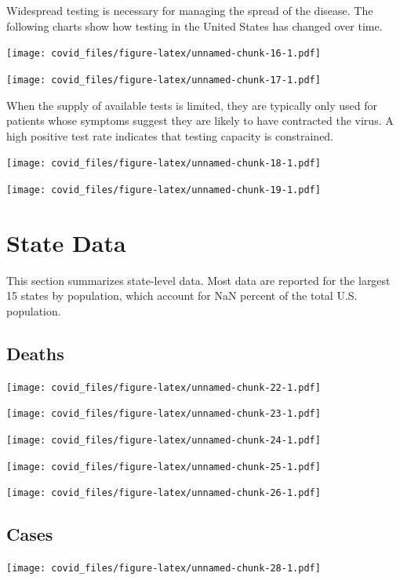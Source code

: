 \documentclass[]{article}
\begin{document}
Widespread testing is necessary for managing the spread of the disease.
The following charts show how testing in the United States has changed
over time.

\texttt{[image: covid\_files/figure-latex/unnamed-chunk-16-1.pdf]}

\texttt{[image: covid\_files/figure-latex/unnamed-chunk-17-1.pdf]}

When the supply of available tests is limited, they are typically only
used for patients whose symptoms suggest they are likely to have
contracted the virus. A high positive test rate indicates that testing
capacity is constrained.

\texttt{[image: covid\_files/figure-latex/unnamed-chunk-18-1.pdf]}

\texttt{[image: covid\_files/figure-latex/unnamed-chunk-19-1.pdf]}

\newpage

\hypertarget{state-data}{%
\section{State Data}\label{state-data}}

This section summarizes state-level data. Most data are reported for the
largest 15 states by population, which account for NaN percent of the
total U.S. population.

\hypertarget{deaths-1}{%
\subsection{Deaths}\label{deaths-1}}

\texttt{[image: covid\_files/figure-latex/unnamed-chunk-22-1.pdf]}

\texttt{[image: covid\_files/figure-latex/unnamed-chunk-23-1.pdf]}

\texttt{[image: covid\_files/figure-latex/unnamed-chunk-24-1.pdf]}
\newpage

\texttt{[image: covid\_files/figure-latex/unnamed-chunk-25-1.pdf]}

\texttt{[image: covid\_files/figure-latex/unnamed-chunk-26-1.pdf]}

\newpage

\hypertarget{cases-1}{%
\subsection{Cases}\label{cases-1}}

\texttt{[image: covid\_files/figure-latex/unnamed-chunk-28-1.pdf]}
\end{document}
